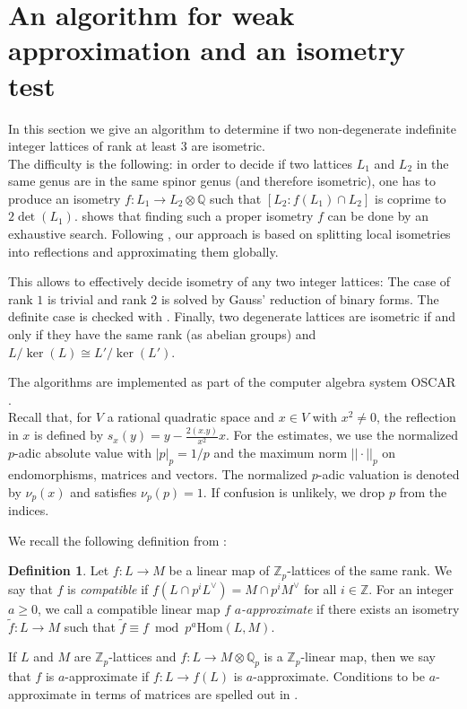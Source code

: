 \documentclass[11pt,letterpaper]{amsart}
\newcommand{\QQ}{\mathbb{Q}}
\newcommand{\ZZ}{\mathbb{Z}}
\theoremstyle{definition}
\newtheorem{definition}[theorem]{Definition}
\theoremstyle{remark}
\begin{document}
\appendix

\section{An algorithm for weak approximation and an isometry test}\label{appendix}
In this section we give an algorithm to determine if two non-degenerate indefinite integer lattices of rank at
least $3$ are isometric. \\ 

The difficulty is the following: in order to decide if two lattices $L_1$ and $L_2$ in the same genus are in the same spinor genus (and therefore isometric), one has to produce an isometry 
$f\colon L_1 \to L_2 \otimes \QQ$ such that $[L_2:f(L_1) \cap L_2]$ is coprime to $2\det(L_1)$.
\Cite{chan.gao.weak.approx} shows that finding such a proper isometry $f$ can be done by an exhaustive search.
Following \cite[101:7]{meara.quadratic}, our approach is based on splitting local isometries into reflections and approximating them globally.

This allows to effectively decide isometry of any two integer lattices:
The case of rank $1$ is trivial and rank $2$ is solved by Gauss' reduction of binary forms. The  definite case is checked with \cite{plesken.souvignier}. Finally, two degenerate lattices are isometric if and only if they have the same rank (as abelian groups) and $L/\ker(L) \cong L'/\ker(L')$.

The algorithms are implemented as part of the computer algebra system OSCAR \cite{OSCAR}.\\


Recall that, for $V$ a rational quadratic space and $x \in V$ with $x^2 \neq 0$, the reflection in $x$ is defined by 
$s_x(y) = y- \frac{2(x.y)}{x^2} x$.
For the estimates, we use the normalized $p$-adic absolute value with $|p|_p=1/p$ and the maximum norm $|| \cdot ||_p$ on endomorphisms, matrices and vectors. The normalized $p$-adic valuation is denoted by $\nu_p(x)$ and satisfies $\nu_p(p)=1$.
If confusion is unlikely, we drop $p$ from the indices.

We recall the following definition from \cite[Section 4]{brandhorst.veniani.hensel-lifting}:
\begin{definition}
Let \(f\colon L \to M\) be a linear map of \(\ZZ_p\)-lattices of the same rank. 
We say that \(f\) is \emph{compatible} if \(f(L \cap p^iL^\vee)=M \cap p^iM^\vee\) for all \(i \in \ZZ\).
For an integer \(a \geq 0\), we call a compatible linear map \(f\) \emph{\(a\)-approximate} if there exists an isometry \(\tilde f \colon L \to M\) such that \(\tilde f \equiv f \bmod p^a\mathrm{Hom}(L,M)\). 
\end{definition}
If $L$ and $M$ are \(\ZZ_p\)-lattices and 
$f\colon L \to M\otimes \QQ_p$ is a $\ZZ_p$-linear map, then we say that $f$ is $a$-approximate if $f\colon L \to f(L)$ is $a$-approximate. Conditions to be $a$-approximate in terms of matrices are spelled out in \cite[Definition 4.2]{brandhorst.veniani.hensel-lifting}.
\end{document}
